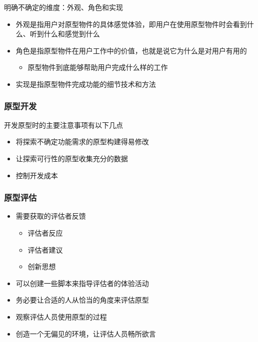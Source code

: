 明确不确定的维度：外观、角色和实现
\begin{itemize}
    \item 外观是指用户对原型物件的具体感觉体验，即用户在使用原型物件时会看到什么、听到什么和感觉到什么 
    \item 角色是指原型物件在用户工作中的价值，也就是说它为什么是对用户有用的
    \begin{itemize}
        \item 原型物件到底能够帮助用户完成什么样的工作
    \end{itemize}
    \item 实现是指原型物件完成功能的细节技术和方法 
\end{itemize}

\subsubsection{原型开发}
开发原型时的主要注意事项有以下几点
\vspace{-0.8em}
\begin{multicols}{2}
    \begin{itemize}
        \item 将探索不确定功能需求的原型构建得易修改
        \item 让探索可行性的原型收集充分的数据
        \item 控制开发成本
    \end{itemize}
\end{multicols}
\vspace{-1em}

\subsubsection{原型评估}
\begin{itemize}
    \item 需要获取的评估者反馈
    \vspace{-0.8em}
    \begin{multicols}{3}
    \begin{itemize}
        \item 评估者反应
        \item 评估者建议
        \item 创新思想
    \end{itemize}
    \end{multicols}
    \vspace{-1em}
    \item 可以创建一些脚本来指导评估者的体验活动 
    \item 务必要让合适的人从恰当的角度来评估原型
    \item 观察评估人员使用原型的过程
    \item 创造一个无偏见的环境，让评估人员畅所欲言
\end{itemize}

